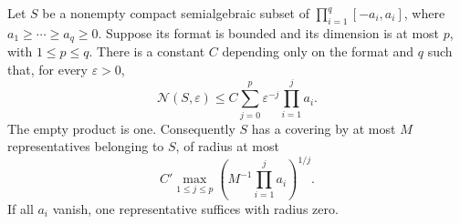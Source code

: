 \begin{lemma}\label{lem:tame-rectangle}
Let $S$ be a nonempty compact semialgebraic subset of
$\prod_{i=1}^{q}[-a_i,a_i]$, where $a_1\ge\cdots\ge a_q\ge0$.
Suppose its format is bounded and its dimension is at most $p$, with
$1\le p\le q$. There is a constant $C$ depending only on the format
and $q$ such that, for every $\varepsilon>0$,
\begin{equation}\label{eq:tame-cover-count}
 \mathcal N(S,\varepsilon)
 \le C\sum_{j=0}^{p}\varepsilon^{-j}\prod_{i=1}^{j}a_i.
\end{equation}
The empty product is one. Consequently $S$ has a covering by at most
$M$ representatives belonging to $S$, of radius at most
\begin{equation}\label{eq:tame-cover-radius}
 C'\max_{1\le j\le p}
           \left(M^{-1}\prod_{i=1}^{j}a_i\right)^{1/j}.
\end{equation}
If all $a_i$ vanish, one representative suffices with radius zero.
\end{lemma}
